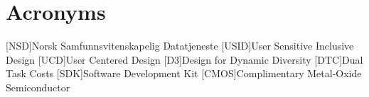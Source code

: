 \chapter*{Acronyms}
\begin{acronym}
[NSD]{Norsk Samfunnsvitenskapelig Datatjeneste}
[USID]{User Sensitive Inclusive Design}
[UCD]{User Centered Design}
[D3]{Design for Dynamic Diversity}
[DTC]{Dual Task Costs}
[SDK]{Software Development Kit}
[CMOS]{Complimentary Metal-Oxide Semiconductor}
\end{acronym}